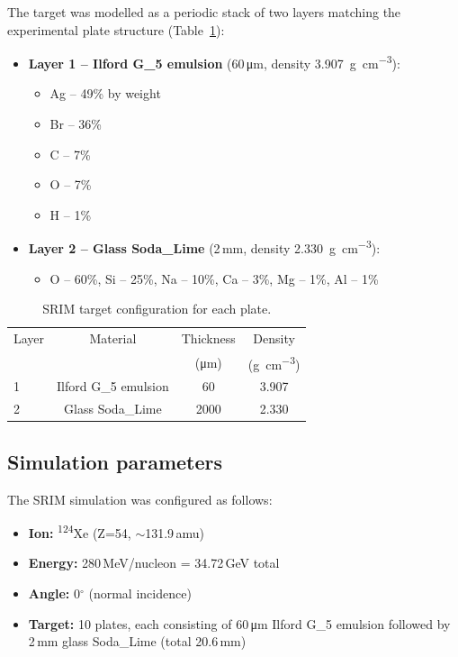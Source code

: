 \documentclass[12pt,a4paper]{article}
\begin{document}
The target was modelled as a periodic stack of two layers matching the
experimental plate structure (Table~\ref{tab:srim_target}):

\begin{itemize}
  \item \textbf{Layer 1 -- Ilford G\_5 emulsion} (60\,\si{\micro\meter},
        density \SI{3.907}{\g\per\cm\cubed}):
        \begin{itemize}
          \item Ag -- 49\% by weight
          \item Br -- 36\%
          \item C -- 7\%
          \item O -- 7\%
          \item H -- 1\%
        \end{itemize}
  \item \textbf{Layer 2 -- Glass Soda\_Lime} (2\,mm,
        density \SI{2.330}{\g\per\cm\cubed}):
        \begin{itemize}
          \item O -- 60\%, Si -- 25\%, Na -- 10\%, Ca -- 3\%,
                Mg -- 1\%, Al -- 1\%
        \end{itemize}
\end{itemize}

\begin{table}[H]
\centering
\caption{SRIM target configuration for each plate.}
\label{tab:srim_target}
\begin{tabular}{lccc}
\toprule
Layer & Material & Thickness & Density \\
 & & (\si{\micro\meter}) & (\si{\g\per\cm\cubed}) \\
\midrule
1 & Ilford G\_5 emulsion & 60 & 3.907 \\
2 & Glass Soda\_Lime & 2000 & 2.330 \\
\bottomrule
\end{tabular}
\end{table}

\subsection{Simulation parameters}

The SRIM simulation was configured as follows:

\begin{itemize}
  \item \textbf{Ion:} \textsuperscript{124}Xe (Z=54, $\sim$131.9\,amu)
  \item \textbf{Energy:} 280\,MeV/nucleon = 34.72\,GeV total
  \item \textbf{Angle:} 0$^\circ$ (normal incidence)
  \item \textbf{Target:} 10 plates, each consisting of
        60\,\si{\micro\meter} Ilford G\_5 emulsion followed by
        2\,mm glass Soda\_Lime (total 20.6\,mm)
\end{itemize}
\end{document}
